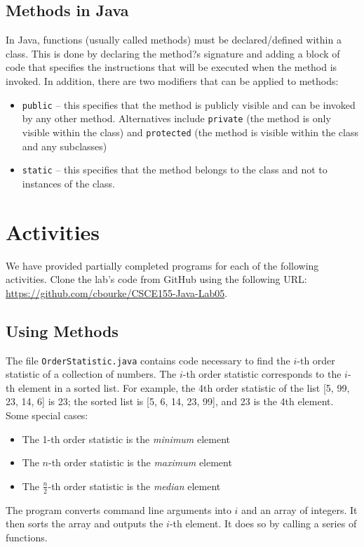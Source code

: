 \documentclass[12pt]{scrartcl}
\begin{document}
\subsection{Methods in Java}

In Java, functions (usually called methods) must be declared/defined 
within a class.  This is done by declaring the method?s signature and 
adding a block of code that specifies the instructions that will be executed 
when the method is invoked.  In addition, there are two modifiers that 
can be applied to methods:
\begin{itemize}
  \item \texttt{public} -- this specifies that the method is publicly 
  	visible and can be invoked by any other method.  Alternatives include 
	\texttt{private} (the method is only visible within the class) 
	and \texttt{protected} (the method is visible within the class 
	and any subclasses)
  \item \texttt{static} -- this specifies that the method belongs to the 
	class and not to instances of the class.
\end{itemize}

\section{Activities}

We have provided partially completed programs for each of the 
following activities.  Clone the lab's code from GitHub using the 
following URL: \url{https://github.com/cbourke/CSCE155-Java-Lab05}.

\subsection{Using Methods}

The file \texttt{OrderStatistic.java} contains code necessary
to find the $i$-th order statistic of a collection of numbers.   The $i$-th order 
statistic corresponds to the $i$-th element in a sorted list.  For example, 
the 4th order statistic of the list [5, 99, 23, 14, 6] is 23; the sorted list 
is [5, 6, 14, 23, 99], and 23 is the 4th element.  Some special cases:
\begin{itemize}
  \item The 1-th order statistic is the \emph{minimum} element
  \item The $n$-th order statistic is the \emph{maximum} element
  \item The $\frac{n}{2}$-th order statistic is the \emph{median} element
\end{itemize}
The program converts command line arguments into $i$ and an
array of integers.  It then sorts the array and outputs the $i$-th 
element.  It does so by calling a series of functions.
\end{document}
